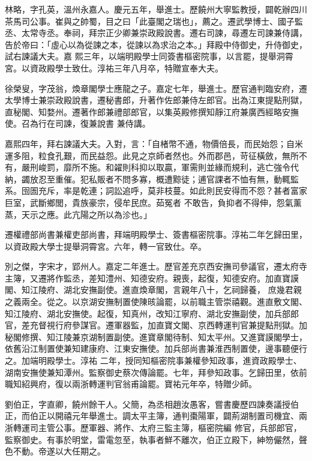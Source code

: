 \begin{pinyinscope}
 林略，字孔英，溫州永嘉人。慶元五年，舉進士。歷饒州大寧監教授，闢乾辦四川茶馬司公事。崔與之帥蜀，目之曰「此臺閣之瑞也」，薦之。遷武學博士、國子監丞、太常寺丞。奉祠，拜宗正少卿兼崇政殿說書。遷右司諫，尋遷左司諫兼侍講，告於帝曰：「虛心以為從諫之本，從諫以為求治之本。」拜殿中侍御史，升侍御史，試右諫議大夫。嘉
 熙三年，以端明殿學士同簽書樞密院事，以言罷，提舉洞霄宮。以資政殿學士致仕。淳祐三年八月卒，特贈宣奉大夫。



 徐榮叟，字茂翁，煥章閣學士應龍之子。嘉定七年，舉進士。歷官通判臨安府，遷太學博士兼崇政殿說書，遷秘書郎，升著作佐郎兼侍左郎官。出為江東提點刑獄，直秘閣、知婺州。遷著作郎兼禮部郎官，以集英殿修撰知靜江府兼廣西經略安撫使。召為行在司諫，復兼說書
 兼侍講。



 嘉熙四年，拜右諫議大夫。入對，言：「自楮幣不通，物價倍長，而民始怨；自米運多阻，粒食孔艱，而民益怨。此見之京師者然也。外而郡邑，苛征橫斂，無所不有，嚴刑峻罰，靡所不施。和糴則科抑以取贏，軍需則並緣而規利，逃亡強令代納，蠲放忍至重催。犯私販者不問多寡，概遭黥徒；逋官課者不恤有無，動輒監系。囹圄充斥，率是乾連；詞訟追呼，莫非枝蔓。如此則民安得而不怨？甚者富家巨室，武斷鄉閭，貴族豪宗，侵牟民庶。茹冤者
 不敢告，負抑者不得伸，怨氣薰蒸，天示之應。此亢陽之所以為沴也。」



 遷權禮部尚書兼權吏部尚書，拜端明殿學士、簽書樞密院事。淳祐二年乞歸田里，以資政殿大學士提舉洞霄宮。六年，轉一官致仕。卒。



 別之傑，字宋才，郢州人。嘉定二年進士。歷官差充京西安撫司參議官，遷太府寺主簿，又遷將作監丞，差知澧州、知德安府。親喪，起復，知德安府。加直寶謨閣、知江陵府、湖北安撫副使。進直煥章閣，言親年八十，乞祠歸養，
 庶幾君親之義兩全。從之。以京湖安撫制置使陳晐論罷，以前職主管崇禧觀。進直敷文閣、知江陵府、湖北安撫使。起復，知真州，改知江寧府、湖北安撫副使，加兵部郎官，差充督視行府參謀官。遷軍器監，加直寶文閣、京西轉運判官兼提點刑獄。加秘閣修撰、知江陵兼京湖制置副使。進寶章閣待制、知太平州。又進寶謨閣學士，依舊沿江制置使兼知建康府、江東安撫使。加兵部尚書兼淮西制置使，邊事聽便行之。加端明殿學士。淳祐
 二年，授同知樞密院事兼權參知政事，進資政殿學士、湖南安撫使兼知潭州。監察御史蔡次傳論罷。七年，拜參知政事。乞歸田里，依前職知紹興府，復以兩浙轉運判官翁甫論罷。寶祐元年卒，特贈少師。



 劉伯正，字直卿，饒州餘干人。父簡，為丞相趙汝愚客，嘗書慶歷四諫奏議授伯正，而伯正以開禧元年舉進士。調太平主簿，通判棗陽軍，闢荊湖制置司機宜、兩浙轉運司主管公事。歷軍器、將作、太府三監主簿，樞密院編
 修官，兵部郎官，監察御史。有事於明堂，雷電忽至，執事者鮮不離次，伯正立殿下，紳笏儼然，聲色不動。帝遂以大任期之。




\end{pinyinscope}

